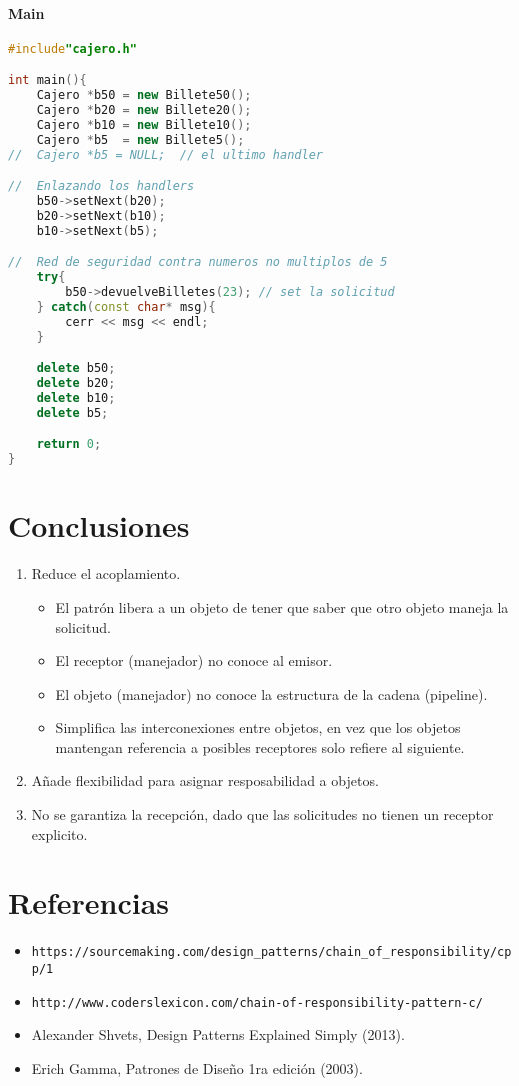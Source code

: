 \documentclass[a4paper,10pt]{article}
\begin{document}
\paragraph{Main}
\begin{lstlisting}[language=C++]
 #include"cajero.h"

int main(){
    Cajero *b50 = new Billete50();
    Cajero *b20 = new Billete20();
    Cajero *b10 = new Billete10();
    Cajero *b5  = new Billete5();
//  Cajero *b5 = NULL;  // el ultimo handler

//  Enlazando los handlers
    b50->setNext(b20);
    b20->setNext(b10);
    b10->setNext(b5);

//  Red de seguridad contra numeros no multiplos de 5
    try{
        b50->devuelveBilletes(23); // set la solicitud
    } catch(const char* msg){
        cerr << msg << endl;
    }

    delete b50;
    delete b20;
    delete b10;
    delete b5;

    return 0;
}
\end{lstlisting}

\section{Conclusiones}
\begin{enumerate}
 \item Reduce el acoplamiento.
 \begin{itemize}
  \item El patr\'on libera a un objeto de tener que saber que otro objeto maneja la solicitud.
  \item El receptor (manejador) no conoce al emisor.
  \item El objeto (manejador) no conoce la estructura de la cadena (pipeline).
  \item Simplifica las interconexiones entre objetos, en vez que los objetos mantengan referencia a posibles receptores solo refiere al siguiente.
 \end{itemize}
 \item A\~nade flexibilidad para asignar resposabilidad a objetos.
 \item No se garantiza la recepci\'on, dado que las solicitudes no tienen un receptor explicito.
\end{enumerate}

\section{Referencias}
\begin{itemize}
 \item \texttt{https://sourcemaking.com/design\_patterns/chain\_of\_responsibility/cpp/1}
 \item \texttt{http://www.coderslexicon.com/chain-of-responsibility-pattern-c/}
 \item Alexander Shvets, Design Patterns Explained Simply (2013).
 \item Erich Gamma, Patrones de Dise\~no 1ra edici\'on (2003).
\end{itemize}
\end{document}

